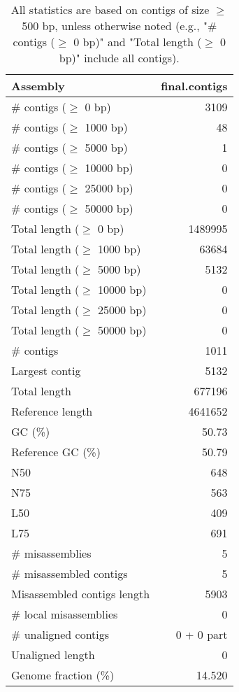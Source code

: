 \documentclass[12pt,a4paper]{article}
\begin{document}
\begin{table}[ht]
\begin{center}
\caption{All statistics are based on contigs of size $\geq$ 500 bp, unless otherwise noted (e.g., "\# contigs ($\geq$ 0 bp)" and "Total length ($\geq$ 0 bp)" include all contigs).}
\begin{tabular}{|l*{1}{|r}|}
\hline
Assembly & final.contigs \\ \hline
\# contigs ($\geq$ 0 bp) & 3109 \\ \hline
\# contigs ($\geq$ 1000 bp) & 48 \\ \hline
\# contigs ($\geq$ 5000 bp) & 1 \\ \hline
\# contigs ($\geq$ 10000 bp) & 0 \\ \hline
\# contigs ($\geq$ 25000 bp) & 0 \\ \hline
\# contigs ($\geq$ 50000 bp) & 0 \\ \hline
Total length ($\geq$ 0 bp) & 1489995 \\ \hline
Total length ($\geq$ 1000 bp) & 63684 \\ \hline
Total length ($\geq$ 5000 bp) & 5132 \\ \hline
Total length ($\geq$ 10000 bp) & 0 \\ \hline
Total length ($\geq$ 25000 bp) & 0 \\ \hline
Total length ($\geq$ 50000 bp) & 0 \\ \hline
\# contigs & 1011 \\ \hline
Largest contig & 5132 \\ \hline
Total length & 677196 \\ \hline
Reference length & 4641652 \\ \hline
GC (\%) & 50.73 \\ \hline
Reference GC (\%) & 50.79 \\ \hline
N50 & 648 \\ \hline
N75 & 563 \\ \hline
L50 & 409 \\ \hline
L75 & 691 \\ \hline
\# misassemblies & 5 \\ \hline
\# misassembled contigs & 5 \\ \hline
Misassembled contigs length & 5903 \\ \hline
\# local misassemblies & 0 \\ \hline
\# unaligned contigs & 0 + 0 part \\ \hline
Unaligned length & 0 \\ \hline
Genome fraction (\%) & 14.520 \\ \hline

\end{tabular}
\end{center}
\end{table}
\end{document}
